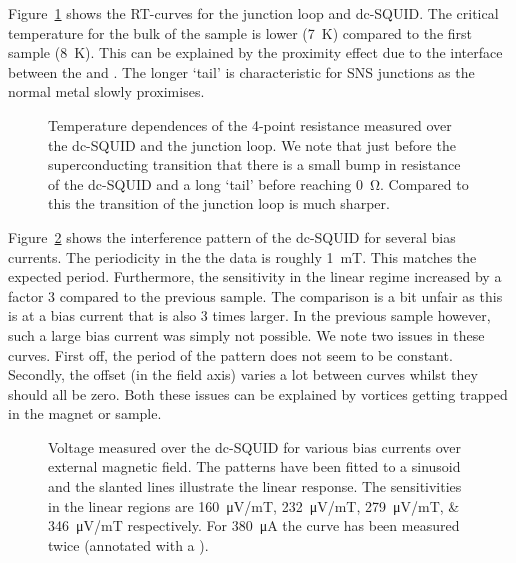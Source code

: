 Figure~\ref{fig:CP2.6B_RT_curves} shows the RT-curves for the junction loop and dc-SQUID. The critical temperature for the bulk of the sample is lower (\qty{7}{\kelvin}) compared to the first sample (\qty{8}{\kelvin}). This can be explained by the proximity effect due to the interface between the  and .\cite{cirilloSuperconductingProximityEffect2005} The longer `tail' is characteristic for SNS junctions as the normal metal slowly proximises.

\begin{figure}[ht!]
	\centering
	
	\caption{Temperature dependences of the 4-point resistance measured over the dc-SQUID and the junction loop. We note that just before the superconducting transition that there is a small bump in resistance of the dc-SQUID and a long `tail' before reaching \qty{0}{\ohm}. Compared to this the transition of the junction loop is much sharper.}
	\label{fig:CP2.6B_RT_curves}
\end{figure}

Figure~\ref{fig:CP2.6B_SQUID_calibration_curves} shows the interference pattern of the dc-SQUID for several bias currents. The periodicity in the the data is roughly \qty{1}{\milli\tesla}. This matches the expected period. Furthermore, the sensitivity in the linear regime increased by a factor 3 compared to the previous sample. The comparison is a bit unfair as this is at a bias current that is also 3 times larger. In the previous sample however, such a large bias current was simply not possible. We note two issues in these curves. First off, the period of the pattern does not seem to be constant. Secondly, the offset (in the field axis) varies a lot between curves whilst they should all be zero. Both these issues can be explained by vortices getting trapped in the magnet or sample. 

\begin{figure}[ht!]
	\centering
	
	\caption{Voltage measured over the dc-SQUID for various bias currents over external magnetic field. The patterns have been fitted to a sinusoid and the slanted lines illustrate the linear response. The sensitivities in the linear regions are \qtylist{160;232;279;346}{\micro\volt/\milli\tesla} respectively. For \qty{380}{\micro\ampere} the curve has been measured twice (annotated with a \dag).}
	\label{fig:CP2.6B_SQUID_calibration_curves}
\end{figure}

